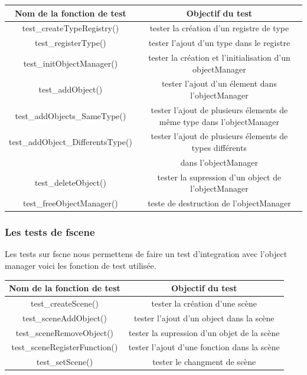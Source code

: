 \documentclass[a4paper,11pt]{article}
\begin{document}
\begin{table}[ht]
\centering
\begin{tabular}{|c|c|}
\hline
\textbf{Nom de la fonction de test} & \textbf{Objectif du test}\\
\hline
test\_createTypeRegistry() & tester la création d'un registre de type \\
\hline
test\_registerType() & tester l'ajout d'un type dans le registre \\
\hline
test\_initObjectManager()& tester la création et l'initialisation d'un objectManager \\
\hline
test\_addObject()& tester l'ajout d'un élement dans l'objectManager \\
\hline
test\_addObjects\_SameType() & tester l'ajout de plusieurs élements de même type dans l'objectManager \\
\hline
test\_addObject\_DifferentsType() &  tester l'ajout de plusieurs élements de  types différents\\& dans l'objectManager\\
\hline
test\_deleteObject() & tester la supression d'un object de l'objectManager\\
\hline
test\_freeObjectManager() & teste de destruction de l'objectManager\\
\hline

\end{tabular}
\end{table}
\vspace{-5mm}
\bigskip
\subsubsection{Les tests de fscene}
Les tests sur fscne nous permettens de faire un test d'integration avec l'object manager voici les fonction de test utilisée.\\
\begin{table}[ht]
\centering
\begin{tabular}{|c|c|}
\hline
\textbf{Nom de la fonction de test} & \textbf{Objectif du test}\\
\hline
test\_createScene() & tester la création d'une scène \\
\hline
test\_sceneAddObject() & tester l'ajout d'un object dans la scène \\
\hline
test\_sceneRemoveObject()& tester la supression d'un objet de la scène\\
\hline
test\_sceneRegisterFunction() & tester l'ajout d'une fonction dans la scène \\
\hline
test\_setScene()  & tester le changment de scène\\
\hline

\end{tabular}
\end{table}
\end{document}
